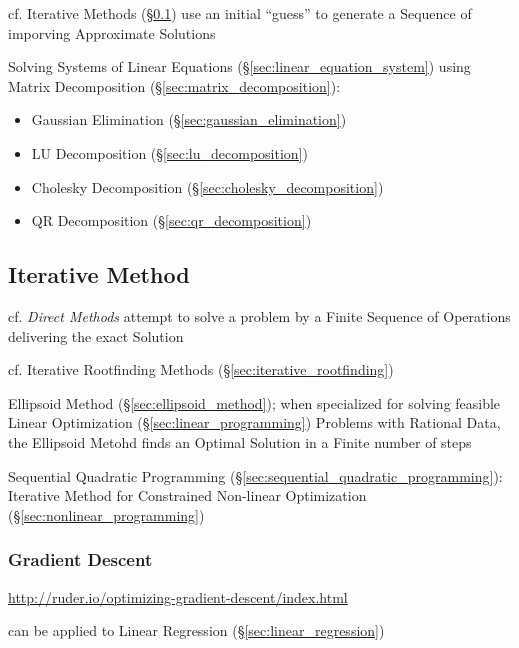 cf. Iterative Methods (\S\ref{sec:iterative_method}) use an initial ``guess'' to
generate a Sequence of imporving Approximate Solutions

Solving Systems of Linear Equations (\S\ref{sec:linear_equation_system})
using Matrix Decomposition (\S\ref{sec:matrix_decomposition}):
\begin{itemize}
  \item Gaussian Elimination (\S\ref{sec:gaussian_elimination})
  \item LU Decomposition (\S\ref{sec:lu_decomposition})
  \item Cholesky Decomposition (\S\ref{sec:cholesky_decomposition})
  \item QR Decomposition (\S\ref{sec:qr_decomposition})
\end{itemize}



\subsection{Iterative Method}\label{sec:iterative_method}

cf. \emph{Direct Methods} attempt to solve a problem by a Finite Sequence of
Operations delivering the exact Solution

\fist cf. Iterative Rootfinding Methods (\S\ref{sec:iterative_rootfinding})

\fist Ellipsoid Method (\S\ref{sec:ellipsoid_method}); when specialized for
solving feasible Linear Optimization (\S\ref{sec:linear_programming}) Problems
with Rational Data, the Ellipsoid Metohd finds an Optimal Solution in a Finite
number of steps

\fist Sequential Quadratic Programming
(\S\ref{sec:sequential_quadratic_programming}): Iterative Method for
Constrained Non-linear Optimization (\S\ref{sec:nonlinear_programming})



\subsubsection{Gradient Descent}\label{sec:gradient_descent}

\url{http://ruder.io/optimizing-gradient-descent/index.html}

can be applied to Linear Regression (\S\ref{sec:linear_regression})



